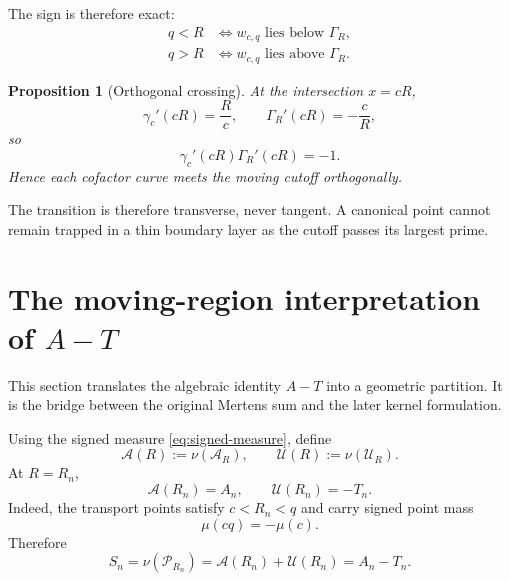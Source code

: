 \documentclass[11pt]{article}
\newtheorem{proposition}[theorem]{Proposition}
\theoremstyle{definition}
\newcommand{\1}{\mathbf{1}}
\begin{document}
The sign is therefore exact:
\begin{align}
 q<R&\iff w_{c,q}\text{ lies below }\Gamma_R,
 \label{eq:below}\\
 q>R&\iff w_{c,q}\text{ lies above }\Gamma_R.
 \label{eq:above}
\end{align}

\begin{proposition}[Orthogonal crossing]
\label{prop:orthogonal-crossing}
At the intersection $x=cR$,
\begin{equation}
 \gamma_c'(cR)=\frac{R}{c},
 \qquad
 \Gamma_R'(cR)=-\frac{c}{R},
 \label{eq:orthogonal-slopes}
\end{equation}
so
\begin{equation}
 \gamma_c'(cR)\Gamma_R'(cR)=-1.
 \label{eq:orthogonal-product}
\end{equation}
Hence each cofactor curve meets the moving cutoff orthogonally.
\end{proposition}

The transition is therefore transverse, never tangent.  A canonical point cannot remain trapped in a thin boundary layer as the cutoff passes its largest prime.


\section{The moving-region interpretation of $A-T$}
\label{sec:moving-region-AT}

This section translates the algebraic identity $A-T$ into a geometric partition.  It is the bridge between the original Mertens sum and the later kernel formulation.

Using the signed measure \cref{eq:signed-measure}, define
\begin{equation}
 \mathcal A(R):=\nu(\mathscr A_R),
 \qquad
 \mathcal U(R):=\nu(\mathscr U_R).
 \label{eq:AU-measures}
\end{equation}
At $R=R_n$,
\begin{equation}
 \mathcal A(R_n)=A_n,
 \qquad
 \mathcal U(R_n)=-T_n.
 \label{eq:AU-AT}
\end{equation}
Indeed, the transport points satisfy $c<R_n<q$ and carry signed point mass
\[
 \mu(cq)=-\mu(c).
\]
Therefore
\begin{equation}
 \boxed{
 S_n
 =\nu(\mathscr P_{R_n})
 =\mathcal A(R_n)+\mathcal U(R_n)
 =A_n-T_n.
 }
 \label{eq:geometric-AT}
\end{equation}
\end{document}
